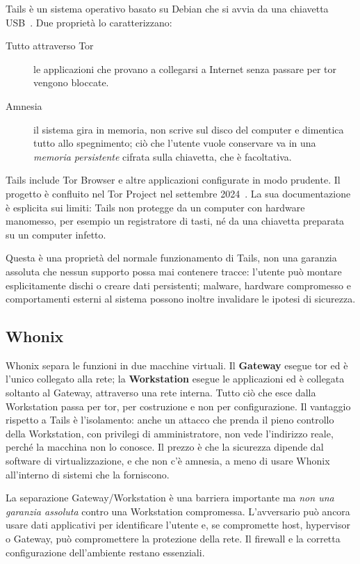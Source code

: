 Tails è un sistema operativo basato su Debian che si avvia da una chiavetta USB~\cite{tailsabout}. Due proprietà lo caratterizzano:
\begin{description}
  \item[Tutto attraverso Tor] le applicazioni che provano a collegarsi a Internet senza passare per tor vengono bloccate.
  \item[Amnesia] il sistema gira in memoria, non scrive sul disco del computer e dimentica tutto allo spegnimento; ciò che l'utente vuole conservare va in una \emph{memoria persistente} cifrata sulla chiavetta, che è facoltativa.
\end{description}
Tails include Tor Browser e altre applicazioni configurate in modo prudente. Il progetto è confluito nel Tor Project nel settembre 2024~\cite{torblogtails}. La sua documentazione è esplicita sui limiti: Tails non protegge da un computer con hardware manomesso, per esempio un registratore di tasti, né da una chiavetta preparata su un computer infetto.

Questa è una proprietà del normale funzionamento di Tails, non una garanzia assoluta che nessun supporto possa mai contenere tracce: l'utente può montare esplicitamente dischi o creare dati persistenti; malware, hardware compromesso e comportamenti esterni al sistema possono inoltre invalidare le ipotesi di sicurezza.

\subsection{Whonix}

Whonix separa le funzioni in due macchine virtuali. Il \textbf{Gateway} esegue tor ed è l'unico collegato alla rete; la \textbf{Workstation} esegue le applicazioni ed è collegata soltanto al Gateway, attraverso una rete interna. Tutto ciò che esce dalla Workstation passa per tor, per costruzione e non per configurazione. Il vantaggio rispetto a Tails è l'isolamento: anche un attacco che prenda il pieno controllo della Workstation, con privilegi di amministratore, non vede l'indirizzo reale, perché la macchina non lo conosce. Il prezzo è che la sicurezza dipende dal software di virtualizzazione, e che non c'è amnesia, a meno di usare Whonix all'interno di sistemi che la forniscono.

La separazione Gateway/Workstation è una barriera importante ma \emph{non una garanzia assoluta} contro una Workstation compromessa. L'avversario può ancora usare dati applicativi per identificare l'utente e, se compromette host, hypervisor o Gateway, può compromettere la protezione della rete. Il firewall e la corretta configurazione dell'ambiente restano essenziali.

